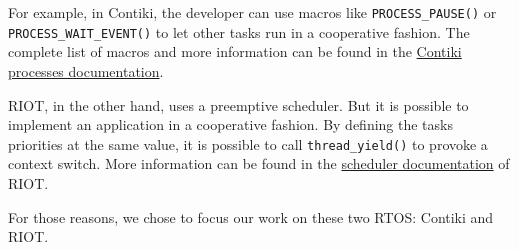 
For example, in Contiki, the developer can use macros like \texttt{PROCESS\_PAUSE()} or \texttt{PROCESS\_WAIT\_EVENT()} to let other tasks run in a cooperative fashion.
The complete list of macros and more information can be found in the \href{https://github.com/contiki-os/contiki/wiki/Processes}{Contiki processes documentation}.

RIOT, in the other hand, uses a preemptive scheduler.
But it is possible to implement an application in a cooperative fashion.
By defining the tasks priorities at the same value, it is possible to call \texttt{thread\_yield()} to provoke a context switch.
More information can be found in the \href{https://riot-os.org/api/group__core__sched.html}{scheduler documentation} of RIOT.

For those reasons, we chose to focus our work on these two RTOS: Contiki and RIOT.